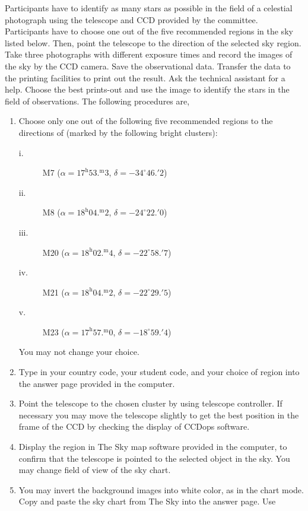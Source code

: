 Participants have to identify as many stars as possible in the field of a
celestial photograph using the telescope and CCD provided by the committee.
Participants have to choose one out of the five recommended regions in the
sky listed below. Then, point the telescope to the direction of the selected
sky region. Take three photographs with different exposure times and record
the images of the sky by the CCD camera. Save the observational data.
Transfer the data to the printing facilities to print out the result. Ask
the technical assistant for a help. Choose the best prints-out and use the
image to identify the stars in the field of observations. The following
procedures are,

\begin{enumerate}
\item Choose only one out of the following five recommended regions to the
  directions of (marked by the following bright clusters):
  \begin{description}
  \item[i.] M7 ($\alpha = 17^{\mathrm{h}}53.^{\mathrm{m}}3$,
    $\delta = -34^\circ 46.'2$)
  \item[ii.] M8 ($\alpha = 18^{\mathrm{h}}04.^{\mathrm{m}}2$,
    $\delta = -24^\circ 22.'0$)
  \item[iii.] M20 ($\alpha = 18^{\mathrm{h}}02.^{\mathrm{m}}4$,
    $\delta = -22^\circ 58.'7$)
  \item[iv.] M21 ($\alpha = 18^{\mathrm{h}}04.^{\mathrm{m}}2$,
    $\delta = -22^\circ 29.'5$)
  \item[v.] M23 ($\alpha = 17^{\mathrm{h}}57.^{\mathrm{m}}0$,
    $\delta = -18^\circ 59.'4$)
  \end{description}
  You may not change your choice.
\item Type in your country code, your student code, and your choice of
  region into the answer page provided in the computer.
\item Point the telescope to the chosen cluster by using telescope
  controller. If necessary you may move the telescope slightly to get the
  best position in the frame of the CCD by checking the display of CCDops
  software.
\item Display the region in The Sky map software provided in the computer,
  to confirm that the telescope is pointed to the selected object in the
  sky. You may change field of view of the sky chart.
\item You may invert the background images into white color, as in the chart
  mode. Copy and paste the sky chart from The Sky into the answer page. Use

\end{enumerate}
